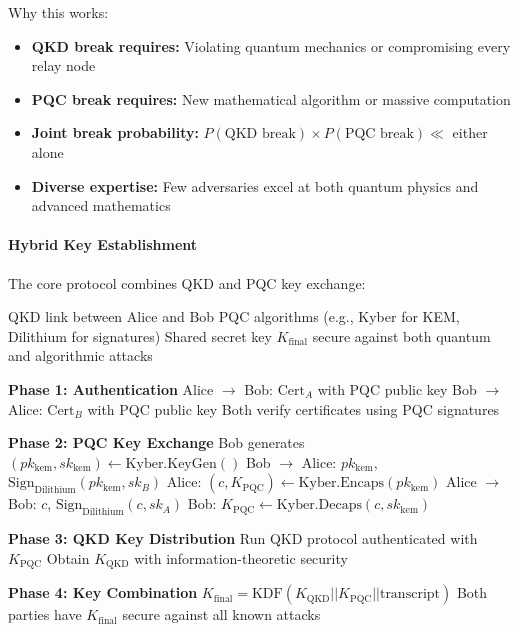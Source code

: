 \documentclass[11pt,a4paper]{article}
\begin{document}
Why this works:
\begin{itemize}
    \item \textbf{QKD break requires:} Violating quantum mechanics or compromising every relay node
    \item \textbf{PQC break requires:} New mathematical algorithm or massive computation
    \item \textbf{Joint break probability:} $P(\text{QKD break}) \times P(\text{PQC break}) \ll$ either alone
    \item \textbf{Diverse expertise:} Few adversaries excel at both quantum physics and advanced mathematics
\end{itemize}

\paragraph{Hybrid Key Establishment}

The core protocol combines QKD and PQC key exchange:

\begin{algorithm}
\caption{Hybrid QKD-PQC Key Establishment}
\label{alg:hybrid-key}
\begin{algorithmic}[1]
\Require QKD link between Alice and Bob
\Require PQC algorithms (e.g., Kyber for KEM, Dilithium for signatures)
\Ensure Shared secret key $K_{\text{final}}$ secure against both quantum and algorithmic attacks

\State \textbf{Phase 1: Authentication}
\State Alice $\rightarrow$ Bob: $\text{Cert}_A$ with PQC public key
\State Bob $\rightarrow$ Alice: $\text{Cert}_B$ with PQC public key
\State Both verify certificates using PQC signatures

\State \textbf{Phase 2: PQC Key Exchange}
\State Bob generates $(pk_{\text{kem}}, sk_{\text{kem}}) \leftarrow \text{Kyber.KeyGen}()$
\State Bob $\rightarrow$ Alice: $pk_{\text{kem}}$, $\text{Sign}_{\text{Dilithium}}(pk_{\text{kem}}, sk_B)$
\State Alice: $(c, K_{\text{PQC}}) \leftarrow \text{Kyber.Encaps}(pk_{\text{kem}})$
\State Alice $\rightarrow$ Bob: $c$, $\text{Sign}_{\text{Dilithium}}(c, sk_A)$
\State Bob: $K_{\text{PQC}} \leftarrow \text{Kyber.Decaps}(c, sk_{\text{kem}})$

\State \textbf{Phase 3: QKD Key Distribution}
\State Run QKD protocol authenticated with $K_{\text{PQC}}$
\State Obtain $K_{\text{QKD}}$ with information-theoretic security

\State \textbf{Phase 4: Key Combination}
\State $K_{\text{final}} = \text{KDF}(K_{\text{QKD}} || K_{\text{PQC}} || \text{transcript})$
\State Both parties have $K_{\text{final}}$ secure against all known attacks
\end{algorithmic}
\end{algorithm}
\end{document}
